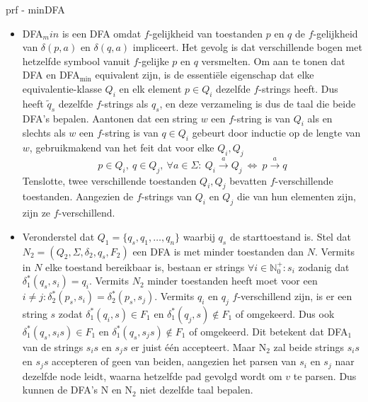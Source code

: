\begin{prf}{prf - minDFA}
    \begin{itemize}
        \item 
        DFA$_min$ is een DFA omdat $f$-gelijkheid van toestanden $p$ en $q$ de $f$-gelijkheid van \(\delta(p,a)\) en \(\delta(q,a)\) impliceert. Het gevolg is dat verschillende bogen met hetzelfde symbool
        vanuit $f$-gelijke $p$ en $q$ versmelten. Om aan te tonen dat DFA en DFA$_{\text{min}}$ equivalent zijn, is de essentiële eigenschap dat elke equivalentie-klasse $Q_i$ en elk element \(p \in Q_i\)
        dezelfde $f$-strings heeft. Dus heeft $\tilde{q}_s$ dezelfde $f$-strings als $q_s$, en deze verzameling is dus de taal die beide DFA's bepalen. Aantonen dat een string $w$ een $f$-string is van $Q_i$
        als en slechts als $w$ een $f$-string is van \(q \in Q_i\) gebeurt door inductie op de lengte van $w$, gebruikmakend van het feit dat voor elke \(Q_i,Q_j\)
        \begin{equation*}
            p \in Q_i, \ q \in Q_j, \ \forall a \in \Sigma: \ Q_i \overset{a}{\to} Q_j \ \Leftrightarrow \ p \overset{a}{\to} q 
        \end{equation*}
        Tenslotte, twee verschillende toestanden $Q_i, Q_j$ bevatten $f$-verschillende toestanden. Aangezien de $f$-strings van $Q_i$ en $Q_j$ die van hun elementen zijn, zijn ze $f$-verschillend.
        \item    
        Veronderstel dat \(Q_1 = \{q_s,q_1, \ldots, q_n\}\) waarbij \(q_s\) de starttoestand is. 
        Stel dat \(N_2 = (Q_2,\Sigma, \delta_2, q_s, F_2)\) een DFA is met minder toestanden dan $N$.
        Vermits in $N$ elke toestand bereikbaar is, bestaan er strings \(\forall i \in \mathbb{N}_0^+: s_i\) zodanig dat \(\delta_1^*(q_s,s_i) = q_i\). 
        Vermits \(N_2\) minder toestanden heeft moet voor een \(i \neq j: \delta_2^*(p_s,s_i) = \delta_2^*(p_s,s_j)\). Vermits \(q_i\) en \(q_j\)
        $f$-verschillend zijn, is er een string \(s\) zodat \(\delta_1^*(q_i,s) \in F_1\) en \(\delta_1^*(q_j,s) \notin F_1\) of omgekeerd.
        Dus ook \(\delta_1^*(q_s,s_is) \in F_1\) en \(\delta_1^*(q_s,s_js) \notin F_1\) of omgekeerd. Dit betekent dat DFA$_1$ van de strings $s_is$ en $s_js$ er juist één accepteert.
        Maar N$_2$ zal beide strings $s_is$ en $s_js$ accepteren of geen van beiden, aangezien het parsen van $s_i$ en $s_j$ naar dezelfde node leidt, waarna hetzelfde pad gevolgd wordt om $v$ te parsen.
        Dus kunnen de DFA's N en N$_2$ niet dezelfde taal bepalen.
    \end{itemize}
\end{prf}

